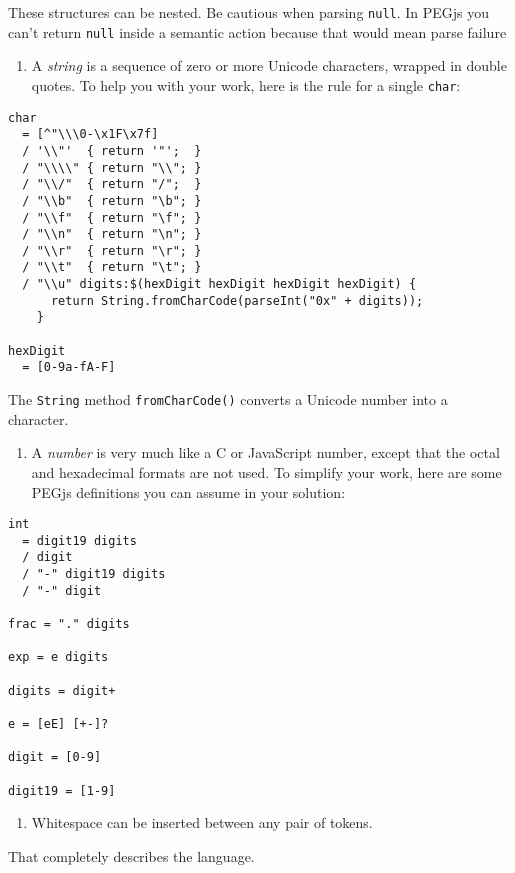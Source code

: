 These structures can be nested. Be cautious when parsing \texttt{null}.
In PEGjs you can't return \texttt{null} inside a semantic action because
that would mean parse failure

\begin{enumerate}
\def\labelenumi{\arabic{enumi}.}
\setcounter{enumi}{3}
\itemsep1pt\parskip0pt
\item
  A \emph{string} is a sequence of zero or more Unicode characters,
  wrapped in double quotes. To help you with your work, here is the rule
  for a single \texttt{char}:
\end{enumerate}

\begin{verbatim}
char
  = [^"\\\0-\x1F\x7f]
  / '\\"'  { return '"';  }
  / "\\\\" { return "\\"; }
  / "\\/"  { return "/";  }
  / "\\b"  { return "\b"; }
  / "\\f"  { return "\f"; }
  / "\\n"  { return "\n"; }
  / "\\r"  { return "\r"; }
  / "\\t"  { return "\t"; }
  / "\\u" digits:$(hexDigit hexDigit hexDigit hexDigit) {
      return String.fromCharCode(parseInt("0x" + digits));
    }

hexDigit
  = [0-9a-fA-F]
\end{verbatim}

The \texttt{String} method \texttt{fromCharCode()} converts a Unicode
number into a character.

\begin{enumerate}
\def\labelenumi{\arabic{enumi}.}
\setcounter{enumi}{4}
\itemsep1pt\parskip0pt
\item
  A \emph{number} is very much like a C or JavaScript number, except
  that the octal and hexadecimal formats are not used. To simplify your
  work, here are some PEGjs definitions you can assume in your solution:
\end{enumerate}

\begin{verbatim}
int
  = digit19 digits
  / digit
  / "-" digit19 digits
  / "-" digit

frac = "." digits

exp = e digits

digits = digit+

e = [eE] [+-]?

digit = [0-9]

digit19 = [1-9]
\end{verbatim}

\begin{enumerate}
\def\labelenumi{\arabic{enumi}.}
\setcounter{enumi}{5}
\itemsep1pt\parskip0pt
\item
  Whitespace can be inserted between any pair of tokens.
\end{enumerate}

That completely describes the language.
